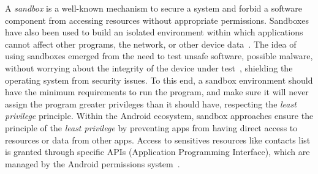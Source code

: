 A \emph{sandbox}
is a well-known mechanism to secure a system and forbid a software component from accessing
resources without appropriate permissions. Sandboxes have also been used to build an isolated
environment within which applications cannot affect other programs, the network, or other device
data~\cite{DBLP:journals/peerj-cs/MaassSCS16}. The idea of using sandboxes emerged from the
need to test unsafe software, possible malware, without worrying about the integrity of the
device under test~\cite{DBLP:conf/esorics/BordoniCS17}, shielding the operating system from security issues.
To this end, a sandbox environment should have the minimum requirements to run the
program, and make sure it will never assign the program greater privileges than it should have,
respecting the \emph{least privilege} principle.
Within the Android ecosystem, sandbox approaches ensure the principle
of the \emph{least privilege} by preventing apps from having direct access to resources or data from other apps. Access to sensitives resources
like contacts list is granted through specific APIs (Application Programming Interface),
which are managed by the Android permissions system~\cite{DBLP:journals/corr/abs-2109-06613}. 




